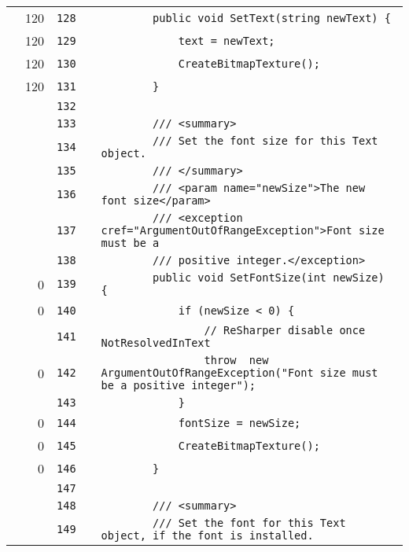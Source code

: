 \documentclass[a4paper,landscape,10pt]{article}
\begin{document}
\begin{longtable}[l]{lrrll}
\cellcolor{green} & 120 & \verb~128~ & & \verb~        public void SetText(string newText) {~\\
\cellcolor{green} & 120 & \verb~129~ & & \verb~            text = newText;~\\
\cellcolor{green} & 120 & \verb~130~ & & \verb~            CreateBitmapTexture();~\\
\cellcolor{green} & 120 & \verb~131~ & & \verb~        }~\\
\cellcolor{gray} &  & \verb~132~ & & \verb~~\\
\cellcolor{gray} &  & \verb~133~ & & \verb~        /// <summary>~\\
\cellcolor{gray} &  & \verb~134~ & & \verb~        /// Set the font size for this Text object.~\\
\cellcolor{gray} &  & \verb~135~ & & \verb~        /// </summary>~\\
\cellcolor{gray} &  & \verb~136~ & & \verb~        /// <param name="newSize">The new font size</param>~\\
\cellcolor{gray} &  & \verb~137~ & & \verb~        /// <exception cref="ArgumentOutOfRangeException">Font size must be a~\\
\cellcolor{gray} &  & \verb~138~ & & \verb~        /// positive integer.</exception>~\\
\cellcolor{red} & 0 & \verb~139~ & & \verb~        public void SetFontSize(int newSize) {~\\
\cellcolor{red} & 0 & \verb~140~ & & \verb~            if (newSize < 0) {~\\
\cellcolor{gray} &  & \verb~141~ & & \verb~                // ReSharper disable once NotResolvedInText~\\
\cellcolor{red} & 0 & \verb~142~ & & \verb~                throw  new ArgumentOutOfRangeException("Font size must be a positive integer");~\\
\cellcolor{gray} &  & \verb~143~ & & \verb~            }~\\
\cellcolor{red} & 0 & \verb~144~ & & \verb~            fontSize = newSize;~\\
\cellcolor{red} & 0 & \verb~145~ & & \verb~            CreateBitmapTexture();~\\
\cellcolor{red} & 0 & \verb~146~ & & \verb~        }~\\
\cellcolor{gray} &  & \verb~147~ & & \verb~~\\
\cellcolor{gray} &  & \verb~148~ & & \verb~        /// <summary>~\\
\cellcolor{gray} &  & \verb~149~ & & \verb~        /// Set the font for this Text object, if the font is installed.~\\

\end{longtable}
\end{document}
